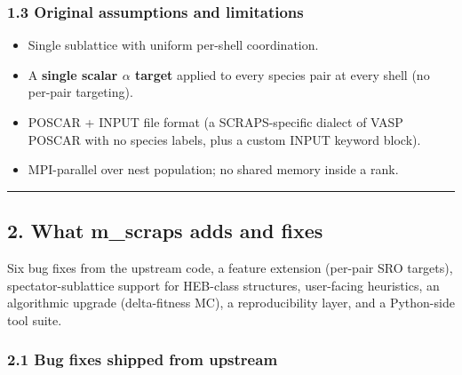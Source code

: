 \documentclass[
  11pt,
]{article}
\providecommand{\tightlist}{%
  \setlength{\itemsep}{0pt}\setlength{\parskip}{0pt}}
\begin{document}
\subsubsection{1.3 Original assumptions and
limitations}\label{original-assumptions-and-limitations}

\begin{itemize}
\tightlist
\item
  Single sublattice with uniform per-shell coordination.
\item
  A \textbf{single scalar \(\alpha\) target} applied to every species
  pair at every shell (no per-pair targeting).
\item
  POSCAR + INPUT file format (a SCRAPS-specific dialect of VASP POSCAR
  with no species labels, plus a custom INPUT keyword block).
\item
  MPI-parallel over nest population; no shared memory inside a rank.
\end{itemize}

\begin{center}\rule{0.5\linewidth}{0.5pt}\end{center}

\subsection{2. What m\_scraps adds and
fixes}\label{what-m_scraps-adds-and-fixes}

Six bug fixes from the upstream code, a feature extension (per-pair SRO
targets), spectator-sublattice support for HEB-class structures,
user-facing heuristics, an algorithmic upgrade (delta-fitness MC), a
reproducibility layer, and a Python-side tool suite.

\subsubsection{2.1 Bug fixes shipped from
upstream}\label{bug-fixes-shipped-from-upstream}
\end{document}
